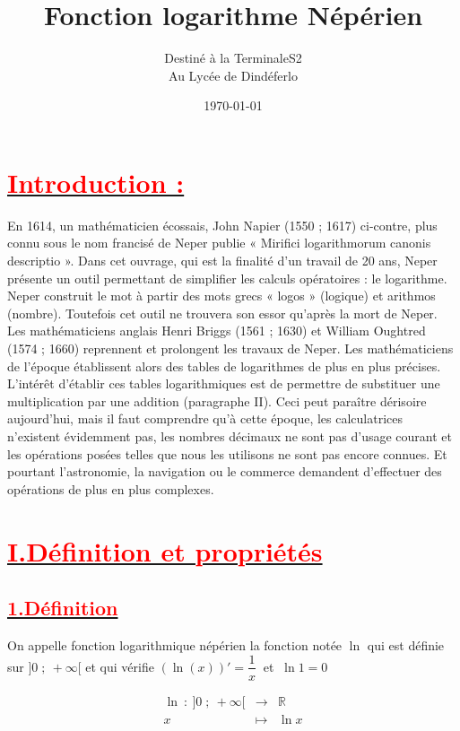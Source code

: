 \documentclass[12pt]{article}
\author{Destiné à la TerminaleS2\\Au Lycée de Dindéferlo}
\title{\textbf{Fonction logarithme Népérien}}
\date{\today}
\begin{document}
\maketitle
\newpage

\section*{\underline{\textbf{\textcolor{red}{Introduction :}}}}

En 1614, un mathématicien écossais, John Napier (1550 ; 1617) ci-contre, plus connu sous le nom francisé de Neper publie « Mirifici logarithmorum canonis descriptio ».
Dans cet ouvrage, qui est la finalité d’un travail de 20 ans, Neper présente un outil permettant de simplifier les calculs opératoires : le logarithme.
Neper construit le mot à partir des mots grecs « logos » (logique) et arithmos (nombre).
Toutefois cet outil ne trouvera son essor qu’après la mort de Neper. Les mathématiciens anglais Henri Briggs (1561 ; 1630) et William Oughtred (1574 ; 1660) reprennent et prolongent les travaux de Neper.
Les mathématiciens de l’époque établissent alors des tables de logarithmes de plus en plus précises.
L’intérêt d’établir ces tables logarithmiques est de permettre de substituer une multiplication par une addition (paragraphe II). Ceci peut paraître dérisoire aujourd’hui, mais il faut comprendre qu’à cette époque, les calculatrices n’existent évidemment pas, les nombres décimaux ne sont pas d’usage courant et les opérations posées telles que nous les utilisons ne sont pas encore connues. Et pourtant l'astronomie, la navigation ou le commerce demandent d’effectuer des opérations de plus en plus complexes.

\section*{\underline{\textbf{\textcolor{red}{I.Définition et propriétés}}}}
\subsection*{\underline{\textbf{\textcolor{red}{1.Définition}}}}
On appelle fonction logarithmique népérien la fonction notée $\ln$ qui est définie sur $]0\;;\ +\infty[$ et qui vérifie $(\ln (x))'=\dfrac{1}{x}\ $ et $\ \ln 1=0$

$$\begin{array}{rcl}
\ln\ :\ ]0\;;\ +\infty[ & \longrightarrow & \mathbb{R} \\
x & \longmapsto & \ln x
\end{array}$$
\end{document}
